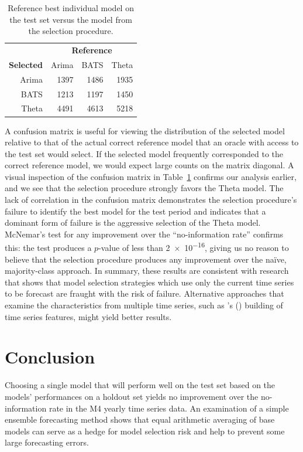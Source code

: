 \documentclass[11pt,3p,review,authoryear]{elsarticle}
\begin{document}
\begin{table}[ht]
\centering
\caption{Reference best individual model on the test set versus the model from the selection procedure.}\label{tab:c}
\begin{tabular}{rrrr}
  \hline
  & \multicolumn{3}{c}{\textbf{Reference}} \\
 \textbf{Selected} & Arima & BATS & Theta  \\
 \hline
 Arima & 1397 & 1486 & 1935 \\
   BATS & 1213 & 1197 & 1450 \\
  Theta & 4491 & 4613 & 5218 \\
   \hline
\end{tabular}
\end{table}

A confusion matrix is useful for viewing the distribution of the selected model relative to that of the actual correct reference model that an oracle with access to the test set would select. If the selected model frequently corresponded to the correct reference model, we would expect large counts on the matrix diagonal. A visual inspection of the confusion matrix in Table~\ref{tab:c} confirms our analysis earlier, and we see that the selection procedure strongly favors the Theta model. The lack of correlation in the confusion matrix demonstrates the selection procedure's failure to identify the best model for the test period and indicates that a dominant form of failure is the aggressive selection of the Theta model. McNemar's test \citep{MCNEMAR} for any improvement over the ``no-information rate'' confirms this: the test produces a $p$-value of less than \num{2e-16}, giving us no reason to believe that the selection procedure produces any improvement over the na\"ive, majority-class approach. In summary, these results are consistent with research that shows that model selection strategies which use only the current time series to be forecast are fraught with the risk of failure. Alternative approaches that examine the characteristics from multiple time series, such as \citeauthor{modelSelection}'s (\citeyear{modelSelection}) building of time series features, might yield better results.



\section{Conclusion}
Choosing a single model that will perform well on the test set based on the models' performances on a holdout set yields no improvement over the no-information rate in the M4 yearly time series data. An examination of a simple ensemble forecasting method shows that equal arithmetic averaging of base models can serve as a hedge for model selection risk and help to prevent some large forecasting errors.
\end{document}
